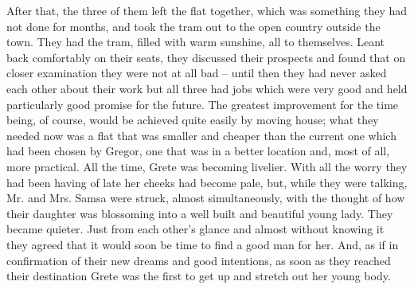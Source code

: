 After that, the three of them left the flat together, which was
something they had not done for months, and took the tram out to the
open country outside the town. They had the tram, filled with warm
sunshine, all to themselves. Leant back comfortably on their seats,
they discussed their prospects and found that on closer examination
they were not at all bad – until then they had never asked each other
about their work but all three had jobs which were very good and held
particularly good promise for the future. The greatest improvement for
the time being, of course, would be achieved quite easily by moving
house; what they needed now was a flat that was smaller and cheaper
than the current one which had been chosen by Gregor, one that was in a
better location and, most of all, more practical. All the time, Grete
was becoming livelier. With all the worry they had been having of late
her cheeks had become pale, but, while they were talking, Mr. and Mrs.
Samsa were struck, almost simultaneously, with the thought of how their
daughter was blossoming into a well built and beautiful young lady.
They became quieter. Just from each other’s glance and almost without
knowing it they agreed that it would soon be time to find a good man
for her. And, as if in confirmation of their new dreams and good
intentions, as soon as they reached their destination Grete was the
first to get up and stretch out her young body.

\endchapter


\bye
